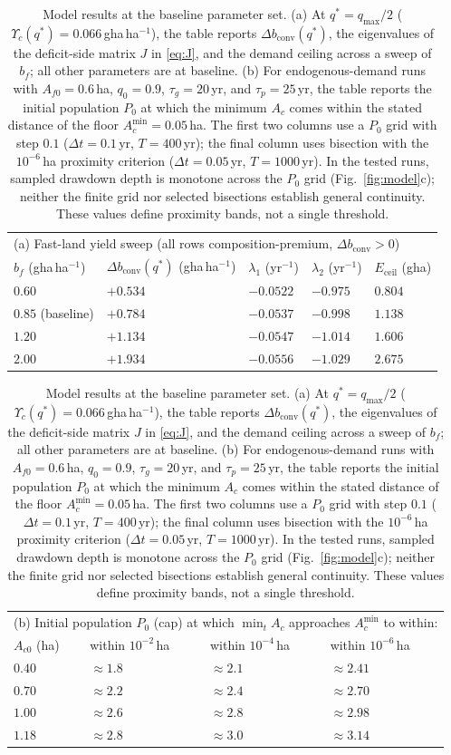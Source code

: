 \documentclass[preprint,12pt,authoryear]{elsarticle}
\newcommand{\dconv}{\Delta b_{\mathrm{conv}}}
\newcommand{\Ups}{\Upsilon_c}
\newcommand{\Eceil}{E_{\mathrm{ceil}}}
\newcommand{\Acmin}{A_c^{\min}}
\begin{document}
\begin{table}[!htbp]
\centering\small
\caption{Model results at the baseline parameter set. (a) At $q^*=q_{\max}/2$ ($\Ups(q^*)=0.066$\,gha\,ha$^{-1}$), the table reports $\dconv(q^*)$, the eigenvalues of the deficit-side matrix $J$ in \eqref{eq:J}, and the demand ceiling across a sweep of $b_f$; all other parameters are at baseline. (b) For endogenous-demand runs with $A_{f0}=0.6$\,ha, $q_0=0.9$, $\tau_g=20$\,yr, and $\tau_p=25$\,yr, the table reports the initial population $P_0$ at which the minimum $A_c$ comes within the stated distance of the floor $\Acmin=0.05$\,ha. The first two columns use a $P_0$ grid with step $0.1$ ($\Delta t=0.1$\,yr, $T=400$\,yr); the final column uses bisection with the $10^{-6}$\,ha proximity criterion ($\Delta t=0.05$\,yr, $T=1000$\,yr). In the tested runs, sampled drawdown depth is monotone across the $P_0$ grid (Fig.~\ref{fig:model}c); neither the finite grid nor selected bisections establish general continuity. These values define proximity bands, not a single threshold.}
\label{tab:model}
\begin{tabular}{l l l l l}
\toprule
\multicolumn{5}{l}{(a) Fast-land yield sweep (all rows composition-premium, $\dconv>0$)}\\
$b_f$ (gha\,ha$^{-1}$) & $\dconv(q^*)$ (gha\,ha$^{-1}$) & $\lambda_1$ (yr$^{-1}$) & $\lambda_2$ (yr$^{-1}$) & $\Eceil$ (gha) \\
\midrule
$0.60$ & $+0.534$ & $-0.0522$ & $-0.975$ & $0.804$ \\
$0.85$ (baseline) & $+0.784$ & $-0.0537$ & $-0.998$ & $1.138$ \\
$1.20$ & $+1.134$ & $-0.0547$ & $-1.014$ & $1.606$ \\
$2.00$ & $+1.934$ & $-0.0556$ & $-1.029$ & $2.675$ \\
\bottomrule
\end{tabular}

\medskip
\begin{tabular}{l l l l}
\toprule
\multicolumn{4}{l}{(b) Initial population $P_0$ (cap) at which $\min_tA_c$ approaches $\Acmin$ to within:}\\ 
$A_{c0}$ (ha) & within $10^{-2}$\,ha & within $10^{-4}$\,ha & within $10^{-6}$\,ha \\
\midrule
$0.40$ & $\approx1.8$ & $\approx2.1$ & $\approx2.41$ \\
$0.70$ & $\approx2.2$ & $\approx2.4$ & $\approx2.70$ \\
$1.00$ & $\approx2.6$ & $\approx2.8$ & $\approx2.98$ \\
$1.18$ & $\approx2.8$ & $\approx3.0$ & $\approx3.14$ \\
\bottomrule
\end{tabular}
\end{table}
\end{document}
